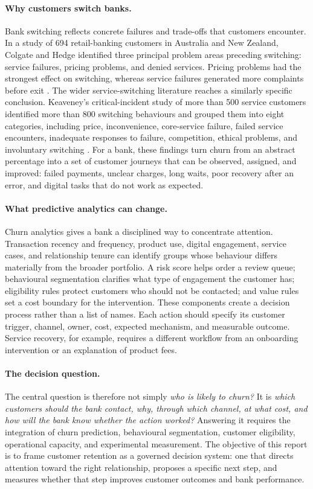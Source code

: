 \documentclass[a4paper,12pt]{article}
\begin{document}
\paragraph*{Why customers switch banks.}
Bank switching reflects concrete failures and trade-offs that customers encounter. In a study of 694 retail-banking customers in Australia and New Zealand, Colgate and Hedge identified three principal problem areas preceding switching: service failures, pricing problems, and denied services. Pricing problems had the strongest effect on switching, whereas service failures generated more complaints before exit \citep{colgateHedge2001}. The wider service-switching literature reaches a similarly specific conclusion. Keaveney's critical-incident study of more than 500 service customers identified more than 800 switching behaviours and grouped them into eight categories, including price, inconvenience, core-service failure, failed service encounters, inadequate responses to failure, competition, ethical problems, and involuntary switching \citep{keaveney1995}. For a bank, these findings turn churn from an abstract percentage into a set of customer journeys that can be observed, assigned, and improved: failed payments, unclear charges, long waits, poor recovery after an error, and digital tasks that do not work as expected.

\paragraph*{What predictive analytics can change.}
Churn analytics gives a bank a disciplined way to concentrate attention. Transaction recency and frequency, product use, digital engagement, service cases, and relationship tenure can identify groups whose behaviour differs materially from the broader portfolio. A risk score helps order a review queue; behavioural segmentation clarifies what type of engagement the customer has; eligibility rules protect customers who should not be contacted; and value rules set a cost boundary for the intervention. These components create a decision process rather than a list of names. Each action should specify its customer trigger, channel, owner, cost, expected mechanism, and measurable outcome. Service recovery, for example, requires a different workflow from an onboarding intervention or an explanation of product fees.

\paragraph*{The decision question.}
The central question is therefore not simply \emph{who is likely to churn?} It is \emph{which customers should the bank contact, why, through which channel, at what cost, and how will the bank know whether the action worked?} Answering it requires the integration of churn prediction, behavioural segmentation, customer eligibility, operational capacity, and experimental measurement. The objective of this report is to frame customer retention as a governed decision system: one that directs attention toward the right relationship, proposes a specific next step, and measures whether that step improves customer outcomes and bank performance.
\end{document}
